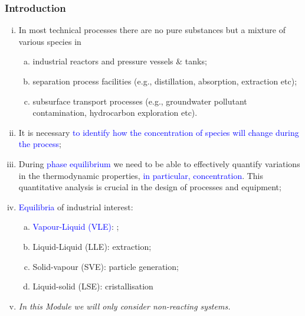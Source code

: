\documentclass[10pt,compress,handout,ignorenonframetext,unknownkeysallowed]{beamer}
\begin{document}
\begin{frame}
  \frametitle{Introduction}
  \begin{enumerate}[i)]
    \item<1-> In most technical processes there are no pure substances but a mixture of various species in
        \begin{enumerate}[a)]
          \item<1-> industrial reactors and pressure vessels $\&$ tanks;
          \item<1-> separation process facilities (e.g., distillation, absorption, extraction etc);
          \item<1-> subsurface transport processes (e.g., groundwater pollutant contamination, hydrocarbon exploration etc).     
        \end{enumerate}
    \item<2-> It is necessary \textcolor{blue}{to identify how the concentration of species will change during the process};
    \item<3-> During \textcolor{blue}{phase equilibrium} we need to be able to effectively quantify variations in the thermodynamic properties, \textcolor{blue}{in particular, concentration}. This quantitative analysis is crucial in the design of processes and equipment;
    \item<4-> \textcolor{blue}{Equilibria} of industrial interest:
        \begin{enumerate}[a)]
          \item<5-> \textcolor{blue}{Vapour-Liquid (VLE)}: ;
          \item<5-> Liquid-Liquid (LLE): extraction;
          \item<5-> Solid-vapour (SVE): particle generation;
          \item<5-> Liquid-solid (LSE): cristallisation
        \end{enumerate}
    \item<5-> {\it In this Module we will only consider non-reacting systems.}
  \end{enumerate}
\end{frame}
\normalsize
\end{document}

